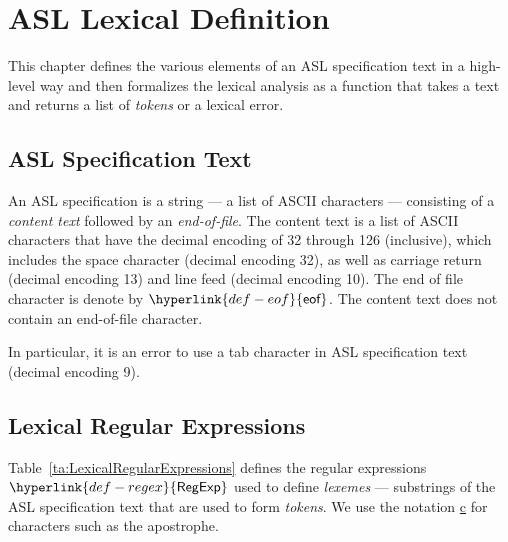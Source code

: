 \documentclass{book}
\newcommand\eof[0]{\hyperlink{def-eof}{\textsf{eof}}}
\newcommand\Char[1]{\underline{#1}}
\newcommand\RegExp[0]{\hyperlink{def-regex}{\textsf{RegExp}}}
\begin{document}
\chapter{ASL Lexical Definition \label{chap:lexicalanalysis}}
This chapter defines the various elements of an ASL specification text in a high-level way
and then formalizes the lexical analysis as a function that takes a text and returns
a list of \emph{tokens} or a lexical error.

\section{ASL Specification Text}
An ASL specification is a string --- a list of ASCII characters --- consisting of a \emph{content text}
followed by an \emph{end-of-file}.
The content text is a list of
ASCII characters that have the decimal encoding of 32 through 126 (inclusive),
which includes the space character (decimal encoding 32),
as well as
carriage return (decimal encoding 13) and line feed (decimal encoding 10).
\hypertarget{def-eof}{}
The end of file character is denote by $\eof$.
The content text does not contain an end-of-file character.

In particular, it is an error to use a tab character in ASL specification text (decimal encoding 9).

\section{Lexical Regular Expressions}

\hypertarget{def-regex}{}
Table~\ref{ta:LexicalRegularExpressions} defines the regular expressions $\RegExp$ used to define
\emph{lexemes} --- substrings of the ASL specification text that are used to form \emph{tokens}.
We use the notation \Char{c} for characters such as the apostrophe.
\end{document}
